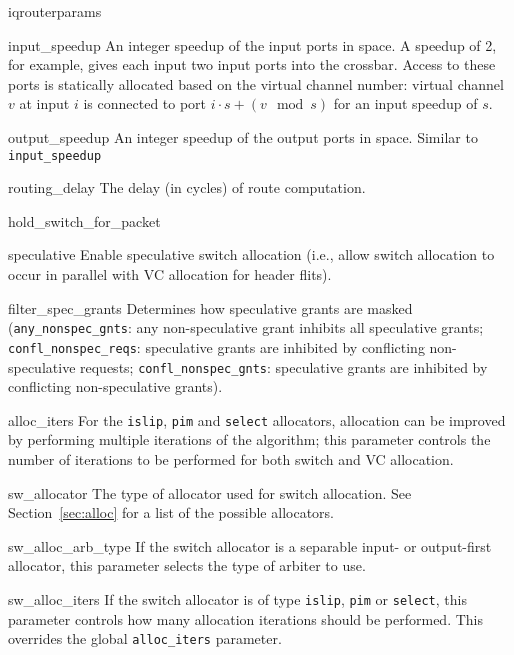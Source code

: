 \documentclass[11pt]{article}
\begin{document}
\begin{opt_list}{iqrouterparams}

\item[input\_speedup] An integer speedup of the input ports in space.
A speedup of 2, for example, gives each input two input ports into the
crossbar.  Access to these ports is statically allocated based on the
virtual channel number: virtual channel $v$ at input $i$ is connected
to port $i \cdot s + (v \mod s)$ for an input speedup of $s$.

\item[output\_speedup] An integer speedup of the output ports in
space.  Similar to \texttt{input\_speedup}

\item[routing\_delay] The delay (in cycles) of route computation.

\item[hold\_switch\_for\_packet]

\item[speculative] Enable speculative switch allocation (i.e., allow switch allocation to occur in parallel with VC allocation for header flits).

\item[filter\_spec\_grants] Determines how speculative grants are masked (\texttt{any\_nonspec\_gnts}: any non-speculative grant inhibits all speculative grants; \texttt{confl\_nonspec\_reqs}: speculative grants are inhibited by conflicting non-speculative requests; \texttt{confl\_nonspec\_gnts}: speculative grants are inhibited by conflicting non-speculative grants).

\item[alloc\_iters] For the \texttt{islip}, \texttt{pim} and \texttt{select} allocators, allocation can be improved by performing multiple iterations of the algorithm; this parameter controls the number of iterations to be performed for both switch and VC allocation.

\item[sw\_allocator] The type of allocator used for switch allocation.
See Section~\ref{sec:alloc} for a list of the possible allocators.

\item[sw\_alloc\_arb\_type] If the switch allocator is a separable input- or output-first allocator, this parameter selects the type of arbiter to use.

\item[sw\_alloc\_iters] If the switch allocator is of type \texttt{islip}, \texttt{pim} or \texttt{select}, this parameter controls how many allocation iterations should be performed. This overrides the global \texttt{alloc\_iters} parameter.


\end{opt_list}
\end{document}
